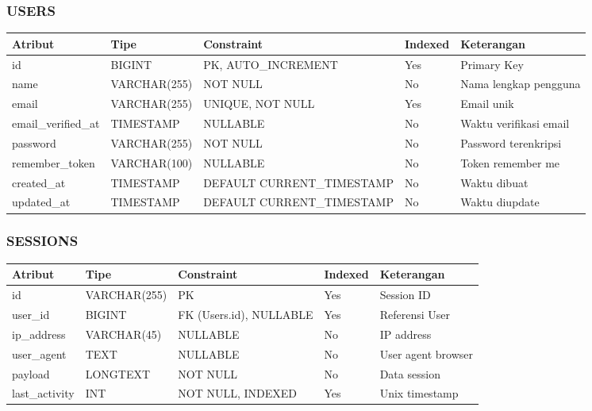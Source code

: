 \documentclass[12pt,a4paper]{article}
\begin{document}
\subsubsection{USERS}
\begin{tabularx}{\textwidth}{|l|l|l|l|X|}
\hline
\textbf{Atribut} & \textbf{Tipe} & \textbf{Constraint} & \textbf{Indexed} & \textbf{Keterangan} \\
\hline
id & BIGINT & PK, AUTO\_INCREMENT & Yes & Primary Key \\
\hline
name & VARCHAR(255) & NOT NULL & No & Nama lengkap pengguna \\
\hline
email & VARCHAR(255) & UNIQUE, NOT NULL & Yes & Email unik \\
\hline
email\_verified\_at & TIMESTAMP & NULLABLE & No & Waktu verifikasi email \\
\hline
password & VARCHAR(255) & NOT NULL & No & Password terenkripsi \\
\hline
remember\_token & VARCHAR(100) & NULLABLE & No & Token remember me \\
\hline
created\_at & TIMESTAMP & DEFAULT CURRENT\_TIMESTAMP & No & Waktu dibuat \\
\hline
updated\_at & TIMESTAMP & DEFAULT CURRENT\_TIMESTAMP & No & Waktu diupdate \\
\hline
\end{tabularx}

\subsubsection{SESSIONS}
\begin{tabularx}{\textwidth}{|l|l|l|l|X|}
\hline
\textbf{Atribut} & \textbf{Tipe} & \textbf{Constraint} & \textbf{Indexed} & \textbf{Keterangan} \\
\hline
id & VARCHAR(255) & PK & Yes & Session ID \\
\hline
user\_id & BIGINT & FK (Users.id), NULLABLE & Yes & Referensi User \\
\hline
ip\_address & VARCHAR(45) & NULLABLE & No & IP address \\
\hline
user\_agent & TEXT & NULLABLE & No & User agent browser \\
\hline
payload & LONGTEXT & NOT NULL & No & Data session \\
\hline
last\_activity & INT & NOT NULL, INDEXED & Yes & Unix timestamp \\
\hline
\end{tabularx}
\end{document}
